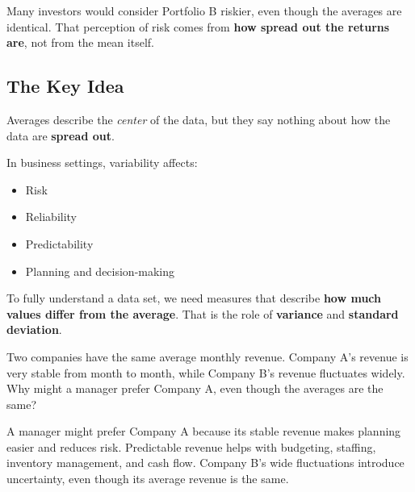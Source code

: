 \documentclass[
  12pt,
  letterpaper,
  DIV=11,
  numbers=noendperiod]{scrreprt}
\providecommand{\tightlist}{%
  \setlength{\itemsep}{0pt}\setlength{\parskip}{0pt}}
\begin{document}
Many investors would consider Portfolio B riskier, even though the
averages are identical. That perception of risk comes from \textbf{how
spread out the returns are}, not from the mean itself.

\subsection{The Key Idea}\label{the-key-idea}

Averages describe the \emph{center} of the data, but they say nothing
about how the data are \textbf{spread out}.

In business settings, variability affects:

\begin{itemize}
\tightlist
\item
  Risk
\item
  Reliability
\item
  Predictability
\item
  Planning and decision-making
\end{itemize}

To fully understand a data set, we need measures that describe
\textbf{how much values differ from the average}. That is the role of
\textbf{variance} and \textbf{standard deviation}.

\begin{tcolorbox}[enhanced jigsaw, colback=white, leftrule=.75mm, toprule=.15mm, bottomtitle=1mm, breakable, coltitle=black, toptitle=1mm, title={Quick Check}, opacitybacktitle=0.6, colbacktitle=quarto-callout-note-color!10!white, arc=.35mm, left=2mm, colframe=quarto-callout-note-color-frame, titlerule=0mm, rightrule=.15mm, bottomrule=.15mm, opacityback=0]

Two companies have the same average monthly revenue. Company A's revenue
is very stable from month to month, while Company B's revenue fluctuates
widely. Why might a manager prefer Company A, even though the averages
are the same?

\end{tcolorbox}

\begin{tcolorbox}[enhanced jigsaw, colback=white, leftrule=.75mm, toprule=.15mm, bottomtitle=1mm, breakable, coltitle=black, toptitle=1mm, title={Suggested answer}, opacitybacktitle=0.6, colbacktitle=quarto-callout-note-color!10!white, arc=.35mm, left=2mm, colframe=quarto-callout-note-color-frame, titlerule=0mm, rightrule=.15mm, bottomrule=.15mm, opacityback=0]

A manager might prefer Company A because its stable revenue makes
planning easier and reduces risk. Predictable revenue helps with
budgeting, staffing, inventory management, and cash flow. Company B's
wide fluctuations introduce uncertainty, even though its average revenue
is the same.

\end{tcolorbox}
\end{document}
